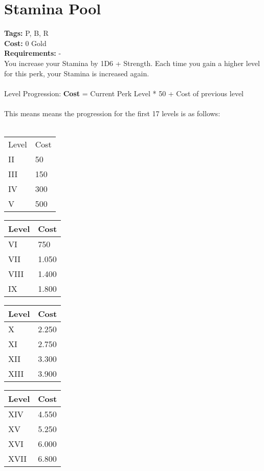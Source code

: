 \section{Stamina Pool}\label{sec:staminapool}
\textbf{Tags:} P, B, R\\
\textbf{Cost:} 0 Gold\\
\textbf{Requirements:} -\\
You increase your Stamina by 1D6 + Strength.
Each time you gain a higher level for this perk, your Stamina is increased again.\\
\\
Level Progression: \textbf{Cost} = Current Perk Level * 50 + Cost of previous level\\
\\
This means means the progression for the first 17 levels is as follows:\\
\\
\begin{minipage}{0.25\textwidth}
    \begin{tabular}{l | l}
        Level & Cost\\
        II & 50\\
        III & 150\\
        IV & 300\\
        V & 500\\
    \end{tabular}
\end{minipage}
\begin{minipage}{0.25\textwidth}
    \begin{tabular}{l | l}
        Level & Cost\\ \hline
        VI & 750\\
        VII & 1.050\\
        VIII & 1.400\\
        IX & 1.800\\
    \end{tabular}
\end{minipage}
\begin{minipage}{0.25\textwidth}
    \begin{tabular}{l | l}
        Level & Cost\\ \hline
        X & 2.250\\
        XI & 2.750\\
        XII & 3.300\\
        XIII & 3.900\\
    \end{tabular}
\end{minipage}
\begin{minipage}{0.25\textwidth}
    \begin{tabular}{l | l}
        Level & Cost\\ \hline
        XIV & 4.550\\
        XV & 5.250\\
        XVI & 6.000\\
        XVII & 6.800\\
    \end{tabular}
\end{minipage}

